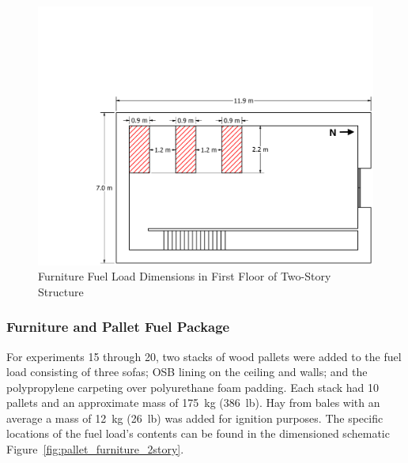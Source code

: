 \documentclass[12pt,oneside]{book}
\begin{document}
\begin{figure}[!ht]
	\includegraphics[width=\columnwidth]{../../DelCo_2014_2015/Drawings/PDFs/CAFS/West_Structure_1st_Floor_Furniture_Only}
	\caption{Furniture Fuel Load Dimensions in First Floor of Two-Story Structure}
	\label{fig:furniture_2story}
\end{figure}

\subsubsection{Furniture and Pallet Fuel Package}
\label{sec:fire_suppression_combo_fuel_2}

For experiments 15 through 20, two stacks of wood pallets were added to the fuel load consisting of three sofas; OSB lining on the ceiling and walls; and the polypropylene carpeting over polyurethane foam padding. Each stack had 10 pallets and an approximate mass of 175~kg (386~lb). Hay from bales with an average a mass of 12~kg (26~lb) was added for ignition purposes. The specific locations of the fuel load's contents can be found in the dimensioned schematic Figure~\ref{fig:pallet_furniture_2story}.
\end{document}
